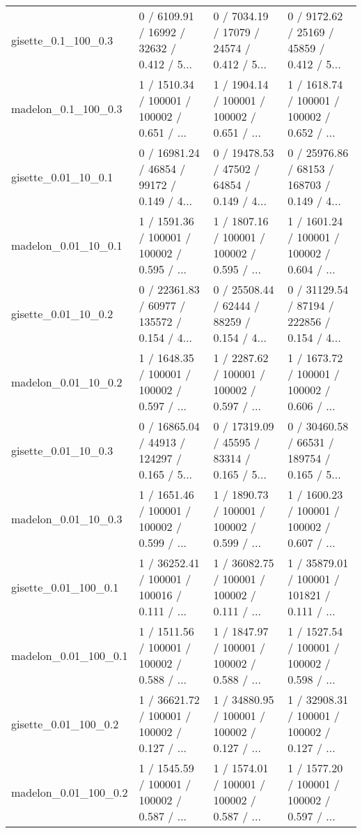 \begin{tabular}{llll}
       gisette\_0.1\_100\_0.3 &  0 / 6109.91 /  16992 /   32632 / 0.412 /     5... &  0 / 7034.19 /  17079 /   24574 / 0.412 /     5... &  0 / 9172.62 /  25169 /   45859 / 0.412 /     5... \\
       madelon\_0.1\_100\_0.3 &  1 / 1510.34 / 100001 /  100002 / 0.651 /      ... &  1 / 1904.14 / 100001 /  100002 / 0.651 /      ... &  1 / 1618.74 / 100001 /  100002 / 0.652 /      ... \\
       gisette\_0.01\_10\_0.1 &  0 / 16981.24 /  46854 /   99172 / 0.149 /    4... &  0 / 19478.53 /  47502 /   64854 / 0.149 /    4... &  0 / 25976.86 /  68153 /  168703 / 0.149 /    4... \\
       madelon\_0.01\_10\_0.1 &  1 / 1591.36 / 100001 /  100002 / 0.595 /      ... &  1 / 1807.16 / 100001 /  100002 / 0.595 /      ... &  1 / 1601.24 / 100001 /  100002 / 0.604 /      ... \\
       gisette\_0.01\_10\_0.2 &  0 / 22361.83 /  60977 /  135572 / 0.154 /    4... &  0 / 25508.44 /  62444 /   88259 / 0.154 /    4... &  0 / 31129.54 /  87194 /  222856 / 0.154 /    4... \\
       madelon\_0.01\_10\_0.2 &  1 / 1648.35 / 100001 /  100002 / 0.597 /      ... &  1 / 2287.62 / 100001 /  100002 / 0.597 /      ... &  1 / 1673.72 / 100001 /  100002 / 0.606 /      ... \\
       gisette\_0.01\_10\_0.3 &  0 / 16865.04 /  44913 /  124297 / 0.165 /    5... &  0 / 17319.09 /  45595 /   83314 / 0.165 /    5... &  0 / 30460.58 /  66531 /  189754 / 0.165 /    5... \\
       madelon\_0.01\_10\_0.3 &  1 / 1651.46 / 100001 /  100002 / 0.599 /      ... &  1 / 1890.73 / 100001 /  100002 / 0.599 /      ... &  1 / 1600.23 / 100001 /  100002 / 0.607 /      ... \\
      gisette\_0.01\_100\_0.1 &  1 / 36252.41 / 100001 /  100016 / 0.111 /     ... &  1 / 36082.75 / 100001 /  100002 / 0.111 /     ... &  1 / 35879.01 / 100001 /  101821 / 0.111 /     ... \\
      madelon\_0.01\_100\_0.1 &  1 / 1511.56 / 100001 /  100002 / 0.588 /      ... &  1 / 1847.97 / 100001 /  100002 / 0.588 /      ... &  1 / 1527.54 / 100001 /  100002 / 0.598 /      ... \\
      gisette\_0.01\_100\_0.2 &  1 / 36621.72 / 100001 /  100002 / 0.127 /     ... &  1 / 34880.95 / 100001 /  100002 / 0.127 /     ... &  1 / 32908.31 / 100001 /  100002 / 0.127 /     ... \\
      madelon\_0.01\_100\_0.2 &  1 / 1545.59 / 100001 /  100002 / 0.587 /      ... &  1 / 1574.01 / 100001 /  100002 / 0.587 /      ... &  1 / 1577.20 / 100001 /  100002 / 0.597 /      ... \\

\end{tabular}
